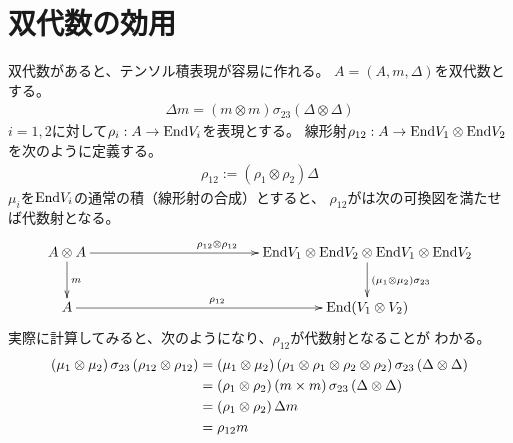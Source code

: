 {\section{双代数の効用}\label{s1:双代数の効用} %
	双代数があると、テンソル積表現が容易に作れる。
	$A=(A,m,\Delta)$を双代数とする。
	\begin{equation*}\begin{split}
		\Delta m = (m\otimes m)\sigma_{23}(\Delta\otimes\Delta)
	\end{split}\end{equation*}
	$i=1,2$に対して$\rho_i:A\to{\ensuremath{\operatorname{End}}} V_i$を表現とする。
	線形射$\rho_{12}:A\to{\ensuremath{\operatorname{End}}} V_1\otimes{\ensuremath{\operatorname{End}}} V_2$を次のように定義する。
	\begin{equation*}\begin{split}
		\rho_{12}:=(\rho_1\otimes\rho_2)\Delta
	\end{split}\end{equation*}
	$\mu_i$を${\operatorname{End}} V_i$の通常の積（線形射の合成）とすると、
	$\rho_{12}$がは次の可換図を満たせば代数射となる。
	\begin{equation*}\xymatrix@C=12em{
			A\otimes A \ar[d]^m \ar[r]^{\rho_{12}\otimes\rho_{12}} 
			& \End V_1\otimes\End V_2\otimes\End V_1\otimes\End V_2
				\ar[d]^{\plr{\mu_1\otimes\mu_2}\sigma_{23}} \\
			A \ar[r]^{\rho_{12}} & \End(V_1\otimes V_2) \\
	}\end{equation*}
	実際に計算してみると、次のようになり、$\rho_{12}$が代数射となることが
	わかる。
	\begin{equation*}\begin{split}
		\mathinner{\left({\mu_1\otimes\mu_2}\right)}\sigma_{23}\mathinner{\left({\rho_{12}\otimes\rho_{12}}\right)}
		&= \mathinner{\left({\mu_1\otimes\mu_2}\right)}
		\mathinner{\left({\rho_1\otimes\rho_1\otimes\rho_2\otimes\rho_2}\right)}\sigma_{23}
		\mathinner{\left({\Delta\otimes\Delta}\right)} \\
		&= \mathinner{\left({\rho_1\otimes\rho_2}\right)}\mathinner{\left({m\times m}\right)}\sigma_{23}
		\mathinner{\left({\Delta\otimes\Delta}\right)} \\
		&= \mathinner{\left({\rho_1\otimes\rho_2}\right)}\Delta m \\
		&= \rho_{12} m
	\end{split}\end{equation*}
}
